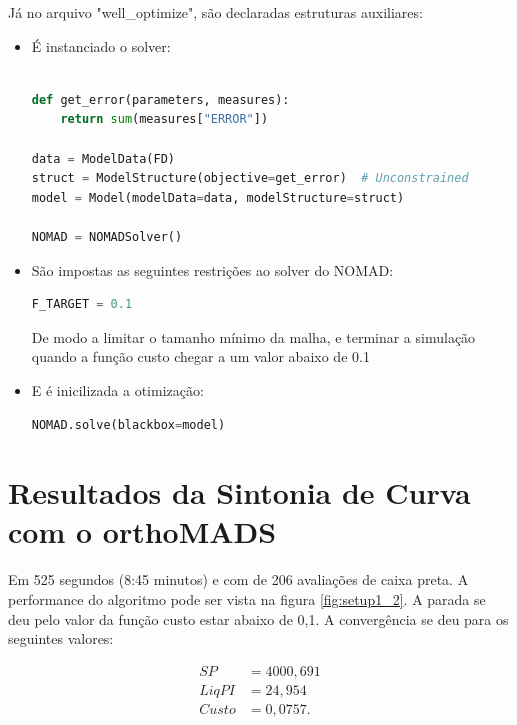 Já no arquivo "well\_optimize", são declaradas estruturas auxiliares:
\begin{itemize}

\item É instanciado o solver:
\begin{lstlisting}[language=Python]%

def get_error(parameters, measures):
    return sum(measures["ERROR"])

data = ModelData(FD)
struct = ModelStructure(objective=get_error)  # Unconstrained
model = Model(modelData=data, modelStructure=struct)

NOMAD = NOMADSolver()

\end{lstlisting}



\item São impostas as seguintes restrições ao solver do NOMAD:
\begin{lstlisting}[language=Python]
F_TARGET = 0.1
\end{lstlisting}

De modo a limitar o tamanho mínimo da malha, e terminar a simulação quando a função custo chegar a um valor abaixo de 0.1

\item E é inicilizada a otimização:
\begin{lstlisting}[language=Python]
NOMAD.solve(blackbox=model)
\end{lstlisting}

\end{itemize}

\section{Resultados da Sintonia de Curva com o orthoMADS}

Em 525 segundos (8:45 minutos) e com de 206 avaliações de caixa preta. A performance do algoritmo pode ser vista na figura \ref{fig:setup1_2}. A parada se deu pelo valor da função custo estar abaixo de 0,1. A convergência se deu para os seguintes valores:

\begin{align*}
SP&= 4000,691 \\
Liq PI &= 24,954 \\
Custo &= 0,0757.
\end{align*}



